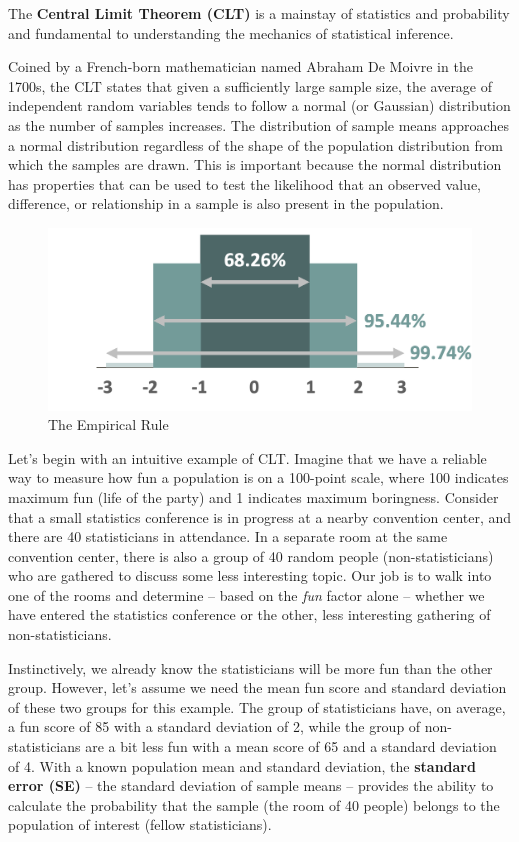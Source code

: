 \documentclass[
]{book}
\begin{document}
The \textbf{Central Limit Theorem (CLT)} is a mainstay of statistics and probability and fundamental to understanding the mechanics of statistical inference.

Coined by a French-born mathematician named Abraham De Moivre in the 1700s, the CLT states that given a sufficiently large sample size, the average of independent random variables tends to follow a normal (or Gaussian) distribution as the number of samples increases. The distribution of sample means approaches a normal distribution regardless of the shape of the population distribution from which the samples are drawn. This is important because the normal distribution has properties that can be used to test the likelihood that an observed value, difference, or relationship in a sample is also present in the population.

\begin{figure}

{\centering \includegraphics[width=0.75\linewidth]{graphics/normal_distribution} 

}

\caption{The Empirical Rule}\label{fig:emp-rule}
\end{figure}

Let's begin with an intuitive example of CLT. Imagine that we have a reliable way to measure how fun a population is on a 100-point scale, where 100 indicates maximum fun (life of the party) and 1 indicates maximum boringness. Consider that a small statistics conference is in progress at a nearby convention center, and there are 40 statisticians in attendance. In a separate room at the same convention center, there is also a group of 40 random people (non-statisticians) who are gathered to discuss some less interesting topic. Our job is to walk into one of the rooms and determine -- based on the \emph{fun} factor alone -- whether we have entered the statistics conference or the other, less interesting gathering of non-statisticians.

Instinctively, we already know the statisticians will be more fun than the other group. However, let's assume we need the mean fun score and standard deviation of these two groups for this example. The group of statisticians have, on average, a fun score of 85 with a standard deviation of 2, while the group of non-statisticians are a bit less fun with a mean score of 65 and a standard deviation of 4. With a known population mean and standard deviation, the \textbf{standard error (SE)} -- the standard deviation of sample means -- provides the ability to calculate the probability that the sample (the room of 40 people) belongs to the population of interest (fellow statisticians).
\end{document}

